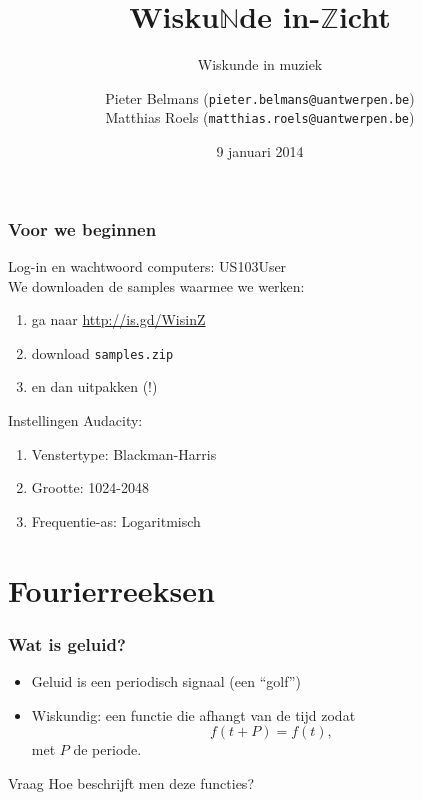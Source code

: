 \documentclass[compress, darktitle, framenumber, totalframenumber]{beamer}
\title{Wisku$\mathbb{N}$de in-$\mathbb{Z}$icht}
\subtitle{Wiskunde in muziek}
\author{Pieter Belmans (\texttt{pieter.belmans@uantwerpen.be}) \\ Matthias Roels (\texttt{matthias.roels@uantwerpen.be})}
\date{9 januari 2014}
\begin{document}
\begin{frame}
  \titlepage
\end{frame}

\begin{frame}
  \frametitle{Voor we beginnen}
Log-in en wachtwoord computers: US103User \\[.2cm] \noindent
We downloaden de samples waarmee we werken:
  \begin{enumerate}
    \item ga naar \url{http://is.gd/WisinZ}
    \item download \texttt{samples.zip}
    \item en dan uitpakken (!)
  \end{enumerate}
Instellingen Audacity:
\begin{enumerate}
\item Venstertype: Blackman-Harris
\item Grootte: 1024-2048
\item Frequentie-as: Logaritmisch
\end{enumerate}  
  
\end{frame}

\section{Fourierreeksen}

\begin{frame}
\frametitle{Wat is geluid?}
\begin{itemize}
\item Geluid is een periodisch signaal (een ``golf'') 
\item Wiskundig: een functie die afhangt van de tijd zodat 
\begin{equation*}
f(t+P)=f(t),
\end{equation*}
met $P$ de periode.
\end{itemize}
\begin{block}{Vraag}
Hoe beschrijft men deze functies? 
\end{block}
\end{frame}
\end{document}

